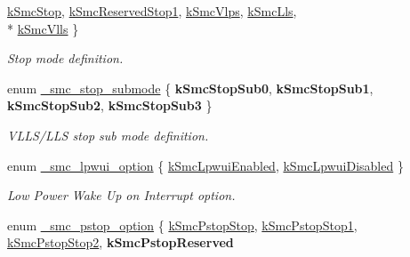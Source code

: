 \begin{DoxyCompactItemize}
\hyperlink{group__smc__hal_gga107d1c64902b4a1a0270a51008b854d5aae6ad5349426cbd86990984b24671c42}{k\+Smc\+Stop}, 
\hyperlink{group__smc__hal_gga107d1c64902b4a1a0270a51008b854d5af1827290b2b1bad2c06cedbcdfdb3277}{k\+Smc\+Reserved\+Stop1}, 
\hyperlink{group__smc__hal_gga107d1c64902b4a1a0270a51008b854d5aaf4964c45a65f831e3ad68f65d5e6d2c}{k\+Smc\+Vlps}, 
\hyperlink{group__smc__hal_gga107d1c64902b4a1a0270a51008b854d5af491cb4b29cc2d75608f8f455c40e8b3}{k\+Smc\+Lls}, 
\\*
\hyperlink{group__smc__hal_gga107d1c64902b4a1a0270a51008b854d5a85790e571986b2ba9ab8d2603aafcadf}{k\+Smc\+Vlls}
 \}\begin{DoxyCompactList}\small\item\em Stop mode definition. \end{DoxyCompactList}
\item 
enum \hyperlink{group__smc__hal_ga027958611f3cd8ff735b930abe16c85c}{\+\_\+smc\+\_\+stop\+\_\+submode} \{ {\bfseries k\+Smc\+Stop\+Sub0}, 
{\bfseries k\+Smc\+Stop\+Sub1}, 
{\bfseries k\+Smc\+Stop\+Sub2}, 
{\bfseries k\+Smc\+Stop\+Sub3}
 \}\hypertarget{group__smc__hal_ga027958611f3cd8ff735b930abe16c85c}{}\label{group__smc__hal_ga027958611f3cd8ff735b930abe16c85c}
\begin{DoxyCompactList}\small\item\em V\+L\+L\+S/\+L\+LS stop sub mode definition. \end{DoxyCompactList}
\item 
enum \hyperlink{group__smc__hal_ga0c1669996e3a8ecbefa05a8d82853d0d}{\+\_\+smc\+\_\+lpwui\+\_\+option} \{ \hyperlink{group__smc__hal_gga0c1669996e3a8ecbefa05a8d82853d0dab925d173b61b63eef95d280e798d7e06}{k\+Smc\+Lpwui\+Enabled}, 
\hyperlink{group__smc__hal_gga0c1669996e3a8ecbefa05a8d82853d0dadfbb17637adbe3770f2f046e49392c6b}{k\+Smc\+Lpwui\+Disabled}
 \}\begin{DoxyCompactList}\small\item\em Low Power Wake Up on Interrupt option. \end{DoxyCompactList}
\item 
enum \hyperlink{group__smc__hal_ga20f680799b3ac8137b69dbff639e34bb}{\+\_\+smc\+\_\+pstop\+\_\+option} \{ \hyperlink{group__smc__hal_gga20f680799b3ac8137b69dbff639e34bbaad36a6469eee8bc42452fb26868f14d3}{k\+Smc\+Pstop\+Stop}, 
\hyperlink{group__smc__hal_gga20f680799b3ac8137b69dbff639e34bba78aac1bff1f02be454b76dbc772c4f35}{k\+Smc\+Pstop\+Stop1}, 
\hyperlink{group__smc__hal_gga20f680799b3ac8137b69dbff639e34bbac22168d7f504760023c2bba5322b89c1}{k\+Smc\+Pstop\+Stop2}, 
{\bfseries k\+Smc\+Pstop\+Reserved}

\end{DoxyCompactItemize}
